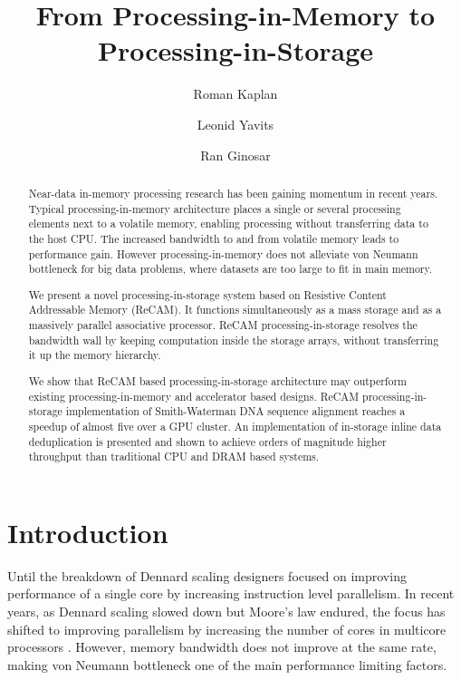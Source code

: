 \documentclass{superfri}
\begin{document}
	
	\title{From Processing-in-Memory to Processing-in-Storage}
	
	\author{Roman Kaplan\footnotemark \and Leonid Yavits\footnotemark[\value{footnote}] \and Ran Ginosar\footnotemark[\value{footnote}]}
	
	
	
	\maketitle{}
	
	\begin{abstract}

	\label{sec:abstract}
	Near-data in-memory processing research has been gaining momentum in recent years. Typical processing-in-memory architecture places a single or several processing elements next to a volatile memory, enabling processing without transferring data to the host CPU. The increased bandwidth to and from volatile memory leads to performance gain. However processing-in-memory does not alleviate von Neumann bottleneck for big data problems, where datasets are too large to fit in main memory. 
	
	We present a novel processing-in-storage system based on Resistive Content Addressable Memory (ReCAM). It functions simultaneously as a mass storage and as a massively parallel associative processor. ReCAM processing-in-storage resolves the bandwidth wall by keeping computation inside the storage arrays, without transferring it up the memory hierarchy. 
	
	We show that ReCAM based processing-in-storage architecture may outperform existing processing-in-memory and accelerator based designs. ReCAM processing-in-storage implementation of Smith-Waterman DNA sequence alignment reaches a speedup of almost five over a GPU cluster. An implementation of in-storage inline data deduplication is presented and shown to achieve orders of magnitude higher throughput than traditional CPU and DRAM based systems.
	

	\end{abstract}
	
	\section*{Introduction}
	\label{sec:motivation}
	Until the breakdown of Dennard scaling designers focused on improving performance of a single core by increasing instruction level parallelism. In recent years, as Dennard scaling slowed down but Moore's law endured, the focus has shifted to improving parallelism by increasing the number of cores in multicore processors \cite{esmaeilzadeh2011dark}. However, memory bandwidth does not improve at the same rate, making von Neumann bottleneck one of the main performance limiting factors.
	
\end{document}
